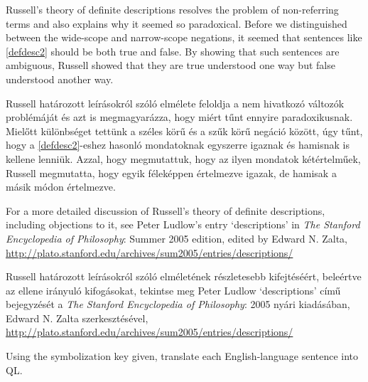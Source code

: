 Russell's theory of definite descriptions resolves the problem of non-referring terms and also explains why it seemed so paradoxical. Before we distinguished between the wide-scope and narrow-scope negations, it seemed that sentences like \ref{defdesc2} should be both true and false. By showing that such sentences are ambiguous, Russell showed that they are true understood one way but false understood another way.

Russell határozott leírásokról szóló elmélete feloldja a nem hivatkozó változók problémáját és azt is megmagyarázza, hogy miért tűnt ennyire paradoxikusnak. Mielőtt különbséget tettünk a széles körű és a szűk körű negáció között, úgy tűnt, hogy a \ref{defdesc2}-eshez hasonló mondatoknak egyszerre igaznak és hamisnak is kellene lenniük. Azzal, hogy megmutattuk, hogy az ilyen mondatok kétértelműek, Russell megmutatta, hogy egyik féleképpen értelmezve igazak, de hamisak a másik módon értelmezve.

For a more detailed discussion of Russell's theory of definite descriptions, including objections to it, see Peter Ludlow's entry `descriptions' in \emph{The Stanford Encyclopedia of Philosophy}: Summer 2005 edition, edited by Edward N. Zalta, \url{http://plato.stanford.edu/archives/sum2005/entries/descriptions/}

Russell határozott leírásokról szóló elméletének részletesebb kifejtéséért, beleértve az ellene irányuló kifogásokat, tekintse meg Peter Ludlow `descriptions' című bejegyzését a \emph{The Stanford Encyclopedia of Philosophy}: 2005 nyári kiadásában, Edward N. Zalta szerkesztésével, \url{http://plato.stanford.edu/archives/sum2005/entries/descriptions/}





\practiceproblems

\solutions
\problempart
\label{pr.QLalligators}
Using the symbolization key given, translate each English-language sentence into QL.

